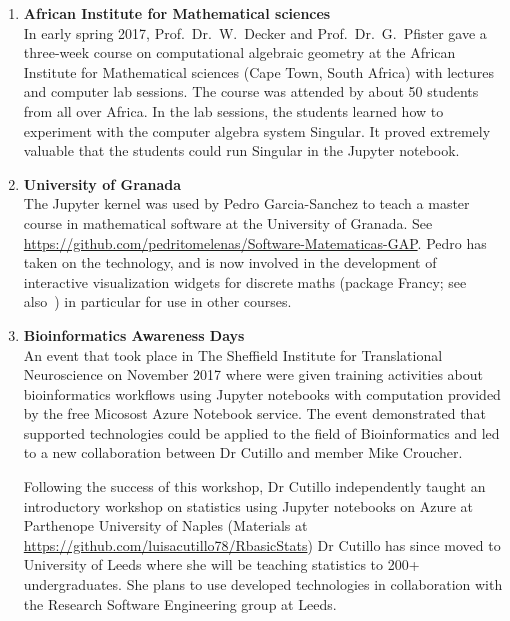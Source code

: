 \begin{enumerate}
\item \textbf{African Institute for Mathematical sciences}\\
  In early spring 2017, Prof.~Dr.~W.~Decker and Prof.~Dr.~G.~Pfister
  gave a three-week course on computational algebraic geometry at the
  African Institute for Mathematical sciences (Cape Town, South
  Africa) with lectures and computer lab sessions. The course was
  attended by about 50 students from all over Africa. In the lab
  sessions, the students learned how to experiment with the computer
  algebra system Singular. It proved extremely valuable that the
  students could run Singular in the Jupyter notebook.


\item \textbf{University of Granada}\\
  The \GAP Jupyter kernel was used by Pedro Garcia-Sanchez to teach a
  master course in mathematical software at the University of Granada.
  See
  \url{https://github.com/pedritomelenas/Software-Matematicas-GAP}.
  Pedro has taken on the technology, and is now involved in the
  development of interactive visualization widgets for discrete maths
  (package Francy; see
  also~) in particular
  for use in other courses.

\item \textbf{ Bioinformatics Awareness Days}\\
An event that took place in The Sheffield Institute for Translational Neuroscience on November 2017 where were given training activities
about bioinformatics workflows using Jupyter notebooks with
computation provided by the free Micosost Azure Notebook service. The event
demonstrated that \ODK supported technologies could be applied to the field of Bioinformatics and led to a new collaboration between Dr
Cutillo and \ODK member Mike Croucher.

Following the success of this workshop, Dr Cutillo independently taught an introductory workshop on statistics using Jupyter notebooks
on Azure at Parthenope University of Naples (Materials at \url{https://github.com/luisacutillo78/RbasicStats}) Dr Cutillo has since moved
to University of Leeds where she will be teaching statistics to 200+ undergraduates. She plans to use \ODK developed technologies
in collaboration with the Research Software Engineering group at Leeds.


\end{enumerate}
